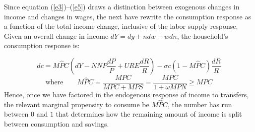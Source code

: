 \documentclass[11pt,letterpaper]{article}
\begin{document}
Since equation (\ref{e3})--(\ref{e5}) draws a distinction between exogenous changes in income and changes in wages, the next have rewrite the consumption response as a function of the total income change, inclusive of the labor supply response. Given an overall change in income $dY = dy + ndw + wdn$, the household's consumption response is: 


\begin{equation}\label{e7}
	dc = M\widehat{P}C \left ( dY - NNP \frac{dP}{P} + URE \frac{dR}{R} \right) - \sigma c (1- M\widehat{P}C)\frac{dR}{R} 
\end{equation}
\vspace{-.7em}
\begin{equation*}
 \text{where} \quad \quad M\widehat{P}C = \frac{MPC}{MPC + MPS} = \frac{MPC}{1 + \omega MPN} \geqslant MPC
\end{equation*}
Hence, once we have factored in the endogenous response of income to transfers, the relevant marginal propensity to consume be $M\widehat{P}C$, the number has run between $0$ and $1$ that determines how the remaining amount of income is split between consumption and savings. 
\end{document}
